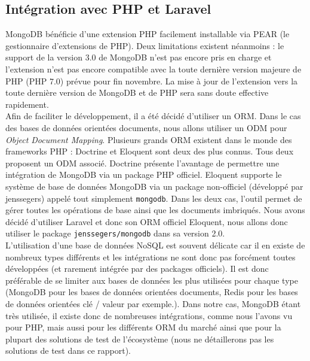\subsection{Intégration avec PHP et Laravel}%
\label{sub:integration_avec_php_et_laravel}

	MongoDB bénéficie d'une extension PHP facilement installable via PEAR (le gestionnaire d'extensions de PHP). Deux limitations existent néanmoins : le support de la version 3.0 de MongoDB n'est pas encore pris en charge et l'extension n'est pas encore compatible avec la toute dernière version majeure de PHP (PHP 7.0) prévue pour fin novembre. La mise à jour de l'extension vers la toute dernière version de MongoDB et de PHP sera sans doute effective rapidement.\\

	Afin de faciliter le développement, il a été décidé d'utiliser un ORM. Dans le cas des bases de données orientées documents, nous allons utiliser un ODM pour \textit{Object Document Mapping}. Plusieurs grands ORM existent dans le monde des frameworks PHP : Doctrine et Eloquent sont deux des plus connus. Tous deux proposent un ODM associé. Doctrine présente l'avantage de permettre une intégration de MongoDB via un package PHP officiel. Eloquent supporte le système de base de données MongoDB via un package non-officiel (développé par jenssegers) appelé tout simplement \verb|mongodb|. Dans les deux cas, l'outil permet de gérer toutes les opérations de base ainsi que les documents imbriqués. Nous avons décidé d'utiliser Laravel et donc son ORM officiel Eloquent, nous allons donc utiliser le package \verb|jenssegers/mongodb| dans sa version 2.0.\\

	L'utilisation d'une base de données NoSQL est souvent délicate car il en existe de nombreux types différents et les intégrations ne sont donc pas forcément toutes développées (et rarement intégrée par des packages officiels). Il est donc préférable de se limiter aux bases de données les plus utilisées pour chaque type (MongoDB pour les bases de données orientées documents, Redis pour les bases de données orientées clé / valeur par exemple.). Dans notre cas, MongoDB étant très utilisée, il existe donc de nombreuses intégrations, comme nous l'avons vu pour PHP, mais aussi pour les différents ORM du marché ainsi que pour la plupart des solutions de test de l'écosystème (nous ne détaillerons pas les solutions de test dans ce rapport).


